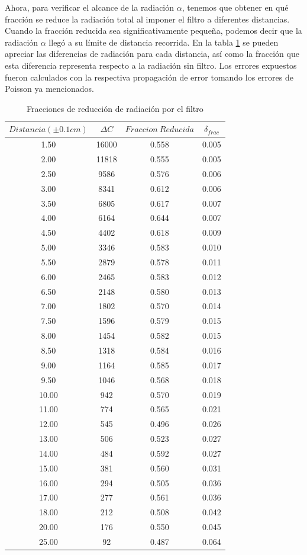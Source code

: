 \documentclass[%
 reprint,
 amsmath,amssymb,
 aps,
]{revtex4-1}
\begin{document}
Ahora, para verificar el alcance de la radiación $\alpha$, tenemos que obtener en qué fracción se reduce la radiación total al imponer el filtro a diferentes distancias. Cuando la fracción reducida sea significativamente pequeña, podemos decir que la radiación $\alpha$ llegó a su límite de distancia recorrida. En la tabla \ref{table:fraccion} se pueden apreciar las diferencias de radiación para cada distancia, así como la fracción que esta diferencia representa respecto a la radiación sin filtro. Los errores expuestos fueron calculados con la respectiva propagación de error tomando los errores de Poisson ya mencionados.\\ 

\begin{table}[h!]
\centering
 \begin{tabular}{|c|c|c|c|} 
 \hline
 $Distancia(\pm0.1cm)$& $\Delta C$& $Fraccion\ Reducida$ & $\delta_{frac}$ \\ [0.5ex] 
 \hline\hline
1.50&16000&0.558&0.005\\
2.00&11818&0.555&0.005\\
2.50&9586&0.576&0.006\\
3.00&8341&0.612&0.006\\
3.50&6805&0.617&0.007\\
4.00&6164&0.644&0.007\\
4.50&4402&0.618&0.009\\
5.00&3346&0.583&0.010\\
5.50&2879&0.578&0.011\\
6.00&2465&0.583&0.012\\
6.50&2148&0.580&0.013\\
7.00&1802&0.570&0.014\\
7.50&1596&0.579&0.015\\
8.00&1454&0.582&0.015\\
8.50&1318&0.584&0.016\\
9.00&1164&0.585&0.017\\
9.50&1046&0.568&0.018\\
10.00&942&0.570&0.019\\
11.00&774&0.565&0.021\\
12.00&545&0.496&0.026\\
13.00&506&0.523&0.027\\
14.00&484&0.592&0.027\\
15.00&381&0.560&0.031\\
16.00&294&0.505&0.036\\
17.00&277&0.561&0.036\\
18.00&212&0.508&0.042\\
20.00&176&0.550&0.045\\
25.00&92&0.487&0.064\\
 [1ex] 
 \hline
 \end{tabular}
 \caption{Fracciones de reducción de radiación por el filtro}
 \label{table:fraccion}
\end{table}
\end{document}
